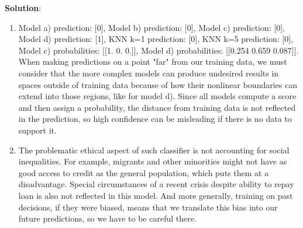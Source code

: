 \documentclass[submit]{../harvardml}
\newenvironment{solution}{
    \vspace{2mm}
    \color{blue}\noindent\textbf{Solution}:
}{}
\begin{document}
\begin{solution}
\begin{enumerate}
        KNN just uses the training data's nearest neighbors to create boundaries, and so they are curved spaces around the clusters for each class. KNN with k=5 allows more automatic accepts in places it shouldn't due to more training points of automatic accepts being more clustered together and automatic rejections being more spread out.
        \item Model a) prediction: [0], Model b) prediction: [0], Model c) prediction: [0], Model d) prediction: [1], KNN k=1 prediction: [0], KNN k=5 prediction: [0], Model c) probabilities: [[1. 0. 0.]], Model d) probabilities: [[0.254 0.659 0.087]].\\
        When making predictions on a point "far" from our training data, we must consider that the more complex models can produce undesired results in spaces outside of training data because of how their nonlinear boundaries can extend into those regions, like for model d). Since all models compute a score and then assign a probability, the distance from training data is not reflected in the prediction, so high confidence can be misleading if there is no data to support it.
        \item The problematic ethical aspect of such classifier is not accounting for social inequalities. For example, migrants and other minorities might not have as good access to credit as the general population, which puts them at a disadvantage. Special circumstances of a recent crisis despite ability to repay loan is also not reflected in this model. And more generally, training on past decisions, if they were biased, means that we translate this bias into our future predictions, so we have to be careful there.
        
	\end{enumerate}
\end{solution}

\newpage
\end{document}

